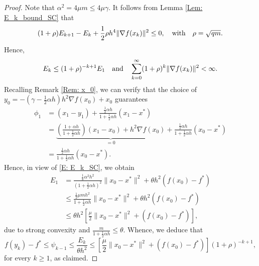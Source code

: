 \documentclass[pdflatex,sn-mathphys-num]{sn-jnl}
\theoremstyle{thmstyleone}
\theoremstyle{thmstyletwo}
\theoremstyle{thmstylethree}
\newcommand{\qbox}[1]{\quad\hbox{#1}\quad}
\begin{document}
\begin{proof}
Note that $\alpha^2=4\mu m \le 4\mu\gamma$. It follows from Lemma \ref{Lem: E_k_bound_SC} that
$$ (1 + \rho )E_{k+1} - E_k + \frac{1}{2}\rho h^4 \| \nabla f(x_k) \|^2 \le 0,\qbox{with} \rho = \sqrt{qm}. $$
Hence,
$$ E_k \le (1 + \rho)^{-k+1}E_1 \qbox{and} \sum_{k=0}^\infty (1+\rho)^k \| \nabla f(x_k) \|^2 < \infty. $$
Recalling Remark \ref{Rem: x_0}, we can verify that the choice of $y_0 = - \left(\gamma - \frac{1}{2}\alpha h \right)h^2 \nabla f(x_0) + x_0$ guarantees
\begin{align*}
\phi_1 
&= (x_1-y_1) + \frac{ \frac{1}{2}\alpha h }{ 1 + \frac{1}{2}\alpha h }(x_1-x^*) \\
&= \underbrace{ \left( \frac{1+\alpha h}{ 1 + \frac{1}{2}\alpha h } \right)(x_1-x_0) + h^2\nabla f(x_0) }_{=0}
  + \frac{ \frac{1}{2}\alpha h }{ 1 + \frac{1}{2}\alpha h }(x_0-x^*) \\
&= \frac{ \frac{1}{2}\alpha h }{ 1 + \frac{1}{2}\alpha h }(x_0-x^*).
\end{align*} 
Hence, in view of \eqref{E: E_k_SC}, we obtain 
\begin{align*}
E_1 
&= \frac{ \frac{1}{8}\alpha^2 h^2 }{ \left( 1 + \frac{1}{2}\alpha h \right)^2 }\| x_0 - x^* \|^2 + \theta h^2 \left( f(x_0) - f^* \right)\\
&\le \frac{ \frac{1}{2}\mu m h^2 }{1 + \frac{1}{2}\alpha h} \| x_0 - x^* \|^2 + \theta h^2 \left( f(x_0) - f^* \right) \\
&\le \theta h^2 \left[ \frac{\mu}{2}\| x_0 - x^* \|^2 + \left( f(x_0) - f^* \right) \right], 
\end{align*}
due to strong convexity and $\frac{m}{1 + \frac{1}{2}\alpha h} \le \theta$. Whence, we deduce that
$$ f(y_k) - f^* \le \psi_{k-1} 
\le \frac{E_k}{\theta h^2}
\le \left[ \frac{\mu}{2}\| x_0 - x^* \|^2 + \left( f(x_0) - f^* \right) \right] (1 + \rho)^{-k+1}, $$
for every $k\ge 1$, as claimed.
\end{proof}
\end{document}
